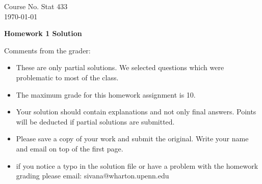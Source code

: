 \documentclass[10pt,a4paper]{article}
\begin{document}
\begin{flushleft}
Course No. Stat 433 \\
\today
\end{flushleft}

\begin{center}
{\Large{\bf  Homework 1 Solution}}
\end{center}

\textcolor[rgb]{0.98,0.00,0.00}{Comments from the grader:}
\begin{itemize}

    \item \textcolor[rgb]{0.98,0.00,0.00}{These are only partial solutions.  We selected
    questions which were problematic to most of the class.}
    \item \textcolor[rgb]{0.98,0.00,0.00}{The maximum grade for this homework assignment is 10.}
    \item \textcolor[rgb]{0.98,0.00,0.00}{Your solution should contain explanations and not only
    final answers. Points will be deducted if partial solutions
    are submitted.}
    \item \textcolor[rgb]{0.98,0.00,0.00}{Please save a copy of your work and submit the original.
    Write your name and email on top of the first page.}
    \item \textcolor[rgb]{0.98,0.00,0.00}{if you notice a typo in the solution file or have a problem with the homework
    grading please email: sivana@wharton.upenn.edu
}
\end{itemize}
\end{document}
